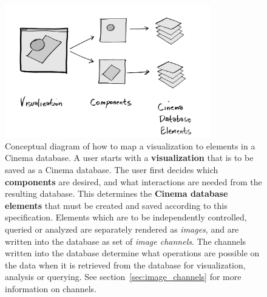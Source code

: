 \begin{figure}[h!]
\centering
\includegraphics[width=0.8\textwidth]{img/image_pipeline_create_fill_labels}
\caption{
    Conceptual diagram of how to map a visualization to elements in a Cinema database. A user starts with a \textbf{visualization} that is to be saved as a Cinema database. The user first decides which \textbf{components} are desired, and what interactions are needed from the resulting database. This determines the \textbf{Cinema database elements} that must be created and saved according to this specification. Elements which are to be independently controlled, queried or analyzed are separately rendered as \textit{images}, and are written into the database as set of \textit{image channels}. The channels written into the database determine what operations are possible on the data when it is retrieved from the database for visualization, analysis or querying. See section~\ref{sec:image_channels} for more information on channels.
}
\label{fig:workflow_create}
\end{figure}


